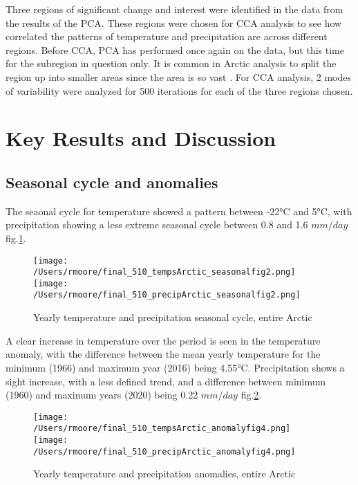 \documentclass[11pt, oneside]{article}
\begin{document}
Three regions of significant change and interest were identified in the data from the results of the PCA. These regions were chosen for CCA analysis to see how correlated the patterns of temperature and precipitation are across different regions. Before CCA, PCA has performed once again on the data, but this time for the subregion in question only. It is common in Arctic analysis to split the region up into smaller areas since the area is so vast \cite{zhang2018variability}.  For CCA analysis, 2 modes of variability were analyzed for 500 iterations for each of the three regions chosen.
 
 

\section{Key Results and Discussion}
\subsection{Seasonal cycle and anomalies}
The seaonal cycle for temperature showed a pattern between -22°C and 5°C, with precipitation showing a less extreme seasonal cycle between 0.8 and 1.6 $mm/day$ fig.\ref{seasonal}. 
\begin{figure}[!htb]
    \centering
      \texttt{[image: /Users/rmoore/final\_510\_tempsArctic\_seasonalfig2.png]}
    \endminipage
      \texttt{[image: /Users/rmoore/final\_510\_precipArctic\_seasonalfig2.png]}
    \endminipage
    \caption{Yearly temperature and precipitation seasonal cycle, entire Arctic}\label{seasonal}
    \end{figure}
A clear increase in temperature over the period is seen in the temperature anomaly, with the difference between the mean yearly temperature for the minimum (1966) and maximum year (2016) being 4.55°C. Precipitation shows a sight increase, with a less defined trend, and a difference between minimum (1960) and maximum years (2020) being 0.22 $mm/day$ fig.\ref{anomaly}.
\begin{figure}[!htb]
\centering
{}
  \texttt{[image: /Users/rmoore/final\_510\_tempsArctic\_anomalyfig4.png]}
\endminipage
{}
  \texttt{[image: /Users/rmoore/final\_510\_precipArctic\_anomalyfig4.png]}
\endminipage
\caption{Yearly temperature and precipitation anomalies, entire Arctic}\label{anomaly}
\end{figure}
\end{document}
